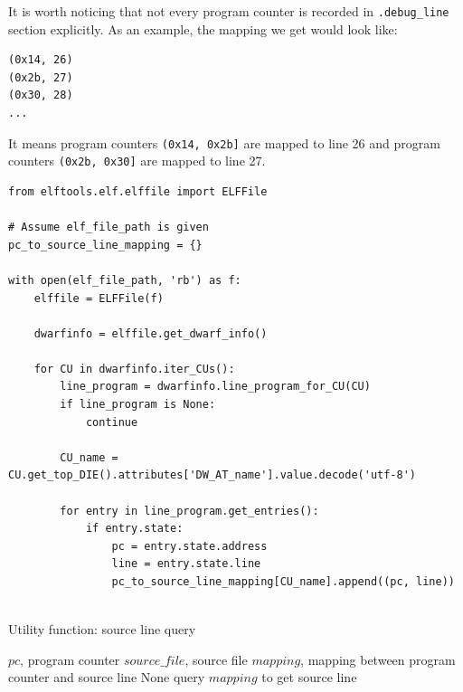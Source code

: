 It is worth noticing that not every program counter is recorded in \texttt{.debug\_line} section explicitly. As an example, the mapping we get would look like:

\medskip
\begin{center}
\begin{minipage}{\textwidth}
\begin{lstlisting}
(0x14, 26)
(0x2b, 27)
(0x30, 28)
...

\end{lstlisting}
\end{minipage}
\end{center}

It means program counters \texttt{(0x14, 0x2b]} are mapped to line 26 and program counters \texttt{(0x2b, 0x30]} are mapped to line 27.

\medskip
\begin{center}
\begin{minipage}{\textwidth}
\begin{lstlisting}
from elftools.elf.elffile import ELFFile

# Assume elf_file_path is given
pc_to_source_line_mapping = {}

with open(elf_file_path, 'rb') as f:
    elffile = ELFFile(f)

    dwarfinfo = elffile.get_dwarf_info()

    for CU in dwarfinfo.iter_CUs():
        line_program = dwarfinfo.line_program_for_CU(CU)
        if line_program is None:
            continue

        CU_name = CU.get_top_DIE().attributes['DW_AT_name'].value.decode('utf-8')

        for entry in line_program.get_entries():
            if entry.state:
                pc = entry.state.address
                line = entry.state.line
                pc_to_source_line_mapping[CU_name].append((pc, line))
                    

\end{lstlisting}
\end{minipage}
\end{center}

\medskip
\begin{algorithm}
\caption{Utility function: source line query}
\label{alg:query_source_line}
\begin{algorithmic}
\REQUIRE $pc$, program counter
\REQUIRE $source\_file$, source file
\REQUIRE $mapping$, mapping between program counter and source line
    \RETURN None
\ENDIF
\STATE query $mapping$ to get source line
\end{algorithmic}
\end{algorithm}

